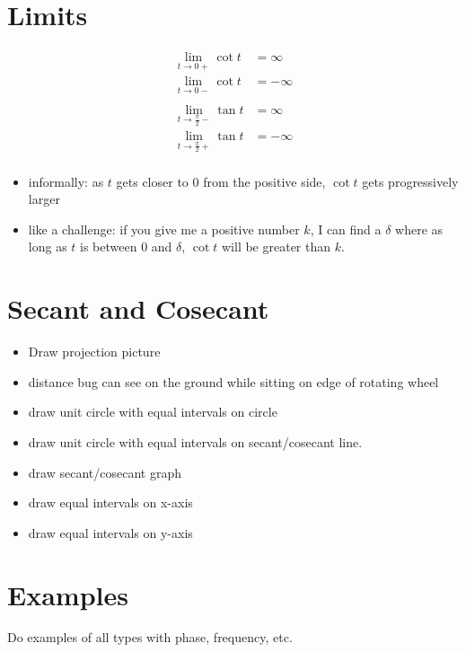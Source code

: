 \documentclass{exam}
\begin{document}
  \section{Limits}
  \begin{align*}
    \lim_{t \to 0+} \cot t & = \infty \\
    \lim_{t \to 0-} \cot t & = -\infty \\
    \\
    \lim_{t \to \frac{\pi}{2}-} \tan t & = \infty \\
    \lim_{t \to \frac{\pi}{2}+} \tan t & = -\infty \\
  \end{align*}

  \begin{itemize}
    \item informally: as $t$ gets closer to 0 from the positive side, $\cot t$ gets progressively larger
    \item like a challenge: if you give me a positive number $k$, I can find a $\delta$ where as long as $t$ is between 0 and
      $\delta$, $\cot t$ will be greater than $k$.
  \end{itemize}

  \section{Secant and Cosecant}

  \begin{itemize}
    \item Draw projection picture 
    \item distance bug can see on the ground while sitting on edge of rotating wheel
    \item draw unit circle with equal intervals on circle
    \item draw unit circle with equal intervals on secant/cosecant line.
    \item draw secant/cosecant graph
    \item draw equal intervals on x-axis 
    \item draw equal intervals on y-axis
  \end{itemize}

  \section{Examples}

  Do examples of all types with phase, frequency, etc.
\end{document}
